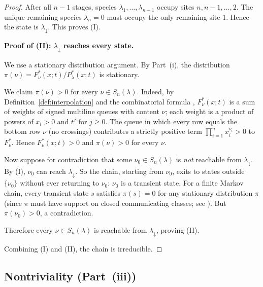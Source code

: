 \documentclass[12pt]{article}
\theoremstyle{definition}
\begin{document}
\begin{proof}
After all $n-1$ stages, species $\lambda_1, \dots, \lambda_{n-1}$
occupy sites $n, n-1, \dots, 2$.  The unique remaining species $\lambda_n = 0$
must occupy the only remaining site $1$.  Hence the state is $\lambda_\downarrow$.
This proves (I).

\medskip
\noindent\textbf{Proof of (II): $\lambda_\downarrow$ reaches every state.}

We use a stationary distribution argument.  By Part~(i), the distribution
$\pi(\nu) = F^*_\nu(x;t)/P^*_\lambda(x;t)$ is stationary.

We claim $\pi(\nu) > 0$ for every $\nu \in S_n(\lambda)$.  Indeed, by
Definition~\ref{def:interpolation} and the combinatorial formula
\cite[Thm.~1.15]{BDW25}, $F^*_\nu(x;t)$ is a sum of weights of signed
multiline queues with content $\nu$; each weight is a product of
powers of $x_i > 0$ and $t^j$ for $j \geq 0$.  The queue in which every
row equals the bottom row $\nu$ (no crossings) contributes a strictly
positive term $\prod_{i=1}^n x_i^{\nu_i} > 0$ to $F^*_\nu$.  Hence
$F^*_\nu(x;t) > 0$ and $\pi(\nu) > 0$ for every $\nu$.

Now suppose for contradiction that some $\nu_0 \in S_n(\lambda)$ is
\emph{not} reachable from $\lambda_\downarrow$.  By (I), $\nu_0$ can
reach $\lambda_\downarrow$.  So the chain, starting from $\nu_0$, exits
to states outside $\{\nu_0\}$ without ever returning to $\nu_0$:
$\nu_0$ is a transient state.  For a finite Markov chain, every transient
state $s$ satisfies $\pi(s) = 0$ for any stationary distribution $\pi$
(since $\pi$ must have support on closed communicating classes;
see \cite[Chapter~3]{Norris97}).
But $\pi(\nu_0) > 0$, a contradiction.

Therefore every $\nu \in S_n(\lambda)$ is reachable from $\lambda_\downarrow$,
proving (II).

\medskip
Combining (I) and (II), the chain is irreducible.
\end{proof}

\subsection{Nontriviality (Part~(iii))}
\end{document}
